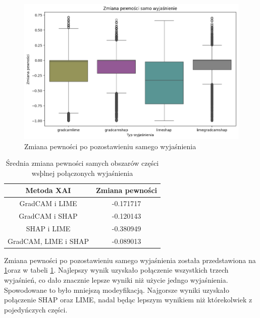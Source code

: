 \begin{figure}
	\centering\includegraphics[width=.6\textwidth]{img/combine_confidence_exp_or}
	\caption{Zmiana pewności po pozostawieniu samego wyjaśnienia}  \label{rys:combineandconfidenceor}
\end{figure}
\begin{table}
	\centering
	\begin{tabular}{|c|c|}
		\hline
		\textbf{Metoda XAI}  & Zmiana pewności \\
		\hline
		GradCAM i LIME       & -0.171717       \\
		\hline
		GradCAM i SHAP       & -0.120143       \\
		\hline
		SHAP i LIME          & -0.380949       \\
		\hline
		GradCAM, LIME i SHAP & -0.089013       \\
		\hline
	\end{tabular}
	\caption{Średnia zmiana pewności samych obszarów części wsþlnej połączonych wyjaśnienia}
	\label{tab:combineandconfidenceor}
\end{table}
Zmiana pewności po pozostawieniu samego wyjaśnienia została przedstawiona na \ref{rys:combineandconfidenceor}oraz w tabeli \ref{tab:combineandconfidenceor}.
Najlepszy wynik uzyskało połączenie wszystkich trzech wyjaśnień, co dało znacznie lepsze wyniki niż użycie jedngo wyjaśnienia.
Spowodowane to było mniejszą modeyfikacją.
Najgorsze wyniki uzyskało połączenie SHAP oraz LIME, nadal będąc lepszym wynikiem niż którekolwiek z pojedyńczych części.

